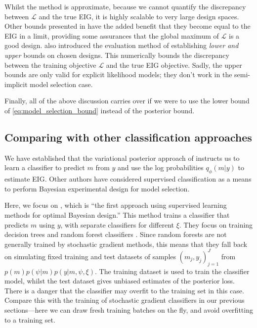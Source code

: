 \documentclass[a4paper, 10pt]{report}
\theoremstyle{plain}
\begin{document}
	Whilst the method is approximate, because we cannot quantify the discrepancy between $\mathcal{L}$ and the true EIG, it is highly scalable to very large design spaces. Other bounds presented in \citet{foster2020unified} have the added benefit that they become equal to the EIG in a limit, providing some assurances that the global maximum of $\mathcal{L}$ is a good design.
	\citet{foster2020unified} also introduced the evaluation method of establishing \emph{lower and upper} bounds on chosen designs. This numerically bounds the discrepancy between the training objective $\mathcal{L}$ and the true EIG objective. Sadly, the upper bounds are only valid for explicit likelihood models; they don't work in the semi-implicit model selection case.
	
	Finally, all of the above discussion carries over if we were to use the lower bound of \eqref{eq:model_selection_bound} instead of the posterior bound.
	
	\subsection{Comparing with other classification approaches}
	We have established that the variational posterior approach of \citet{foster2019variational} instructs us to learn a classifier to predict $m$ from $y$ and use the log probabilities $q_\phi(m|y)$ to estimate EIG.
	Other authors have considered supervised classification as a means to perform Bayesian experimental design for model selection.
	
	Here, we focus on \citet{hainy2018optimal}, which is ``the first approach using supervised learning methods for optimal Bayesian design.''
	This method trains a classifier that predicts $m$ using $y$, with separate classifiers for different $\xi$.
	They focus on training decision trees and random forest classifiers \citep{breiman2001random}.
	Since random forests are not generally trained by stochastic gradient methods, this means that they fall back on simulating fixed training and test datasets of samples $(m_j, y_j)_{j=1}^J$ from $p(m)p(\psi|m)p(y|m,\psi,\xi)$.
	The training dataset is used to train the classifier model, whilst the test dataset gives unbiased estimates of the posterior loss.
	There is a danger that the classifier may overfit to the training set in this case.
	Compare this with the training of stochastic gradient classifiers in our previous sections---here we can draw fresh training batches on the fly, and avoid overfitting to a training set.
	
\end{document}
